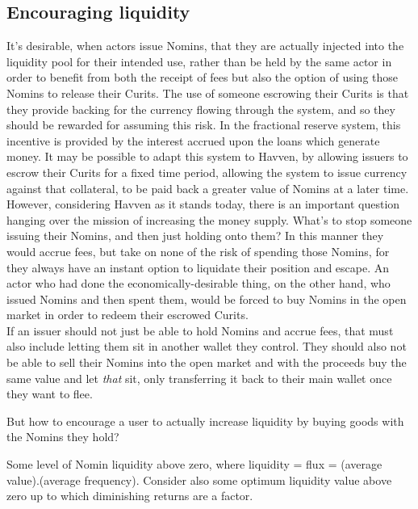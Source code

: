 \documentclass{article}
\begin{document}
\pagebreak
\subsection{Encouraging liquidity}

\noindent It's desirable, when actors issue Nomins, that they are actually injected into the liquidity pool for their intended use, rather than be held by the same actor in order to benefit from both the receipt of fees but also the option of using those Nomins to release their Curits. The use of someone escrowing their Curits is that they provide backing for the currency flowing through the system, and so they should be rewarded for assuming this risk. In the fractional reserve system, this incentive is provided by the interest accrued upon the loans which generate money. It may be possible to adapt this system to Havven, by allowing issuers to escrow their Curits for a fixed time period, allowing the system to issue currency against that collateral, to be paid back a greater value of Nomins at a later time. \\

\noindent However, considering Havven as it stands today, there is an important question hanging over the mission of increasing the money supply. What's to stop someone issuing their Nomins, and then just holding onto them? In this manner they would accrue fees, but take on none of the risk of spending those Nomins, for they always have an instant option to liquidate their position and escape. An actor who had done the economically-desirable thing, on the other hand, who issued Nomins and then spent them, would be forced to buy Nomins in the open market in order to redeem their escrowed Curits. \\

\noindent If an issuer should not just be able to hold Nomins and accrue fees, that must also include letting them sit in another wallet they control. They should also not be able to sell their Nomins into the open market and with the proceeds buy the same value and let \textit{that} sit, only transferring it back to their main wallet once they want to flee.

\noindent But how to encourage a user to actually increase liquidity by buying goods with the Nomins they hold? 

\noindent Some level of Nomin liquidity above zero, where liquidity = flux = (average value).(average frequency). Consider also some optimum liquidity value above zero up to which diminishing returns are a factor.
\end{document}
